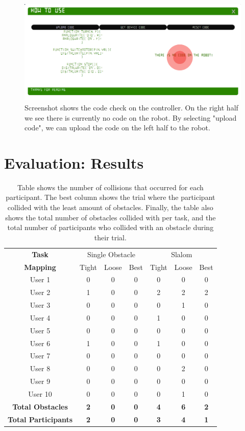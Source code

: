 \documentclass{l4proj}
\begin{document}
\begin{appendices}
\begin{figure}
    \centering
    \includegraphics[width=1\textwidth]{images/code-editor-nocode.png}
    \caption{Screenshot shows the code check on the controller. On the right half we see there is currently no code on the robot. By selecting "upload code", we can upload the code on the left half to the robot.}
    \label{fig:code-editor}
\end{figure}


\chapter{Evaluation: Results}

\begin{table}[!ht]
\centering
\caption{Table shows the number of collisions that occurred for each participant. The best column shows the trial where the participant collided with the least amount of obstacles. Finally, the table also shows the total number of obstacles collided with per task, and the total number of participants who collided with an obstacle during their trial.}
\label{tab:joystick-collisions}
\begin{tabular}{ccccccc}
\textbf{Task} & \multicolumn{3}{c}{Single Obstacle} & \multicolumn{3}{c}{Slalom} \\
\textbf{Mapping} & Tight & Loose & Best & Tight & Loose & Best \\
User 1 & 0 & 0 & 0 & 0 & 0 & 0 \\
User 2 & 1 & 0 & 0 & 2 & 2 & 2 \\
User 3 & 0 & 0 & 0 & 0 & 1 & 0 \\
User 4 & 0 & 0 & 0 & 1 & 0 & 0 \\
User 5 & 0 & 0 & 0 & 0 & 0 & 0 \\
User 6 & 1 & 0 & 0 & 1 & 0 & 0 \\
User 7 & 0 & 0 & 0 & 0 & 0 & 0 \\
User 8 & 0 & 0 & 0 & 0 & 2 & 0 \\
User 9 & 0 & 0 & 0 & 0 & 0 & 0 \\
User 10 & 0 & 0 & 0 & 0 & 1 & 0 \\
\textbf{Total Obstacles} & \textbf{2} & \textbf{0} & \textbf{0} & \textbf{4} & \textbf{6} & \textbf{2} \\
\textbf{Total Participants} & \textbf{2} & \textbf{0} & \textbf{0} & \textbf{3} & \textbf{4} & \textbf{1}
\end{tabular}
\end{table}


\end{appendices}
\end{document}
